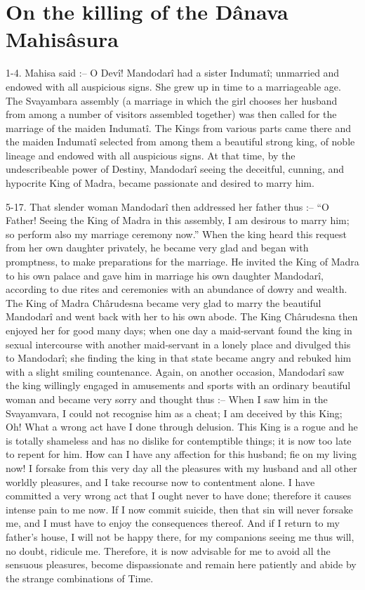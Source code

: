 ﻿\chapter{On the killing of the D\^anava Mahis\^asura}

1-4. Mahisa said :-- O Dev\^i! Mandodar\^i had a sister Indumat\^i; unmarried and endowed with all auspicious signs. She grew up in time to a marriageable age. The Svayambara assembly (a marriage in which the girl chooses her husband from among a number of visitors assembled together) was then called for the marriage of the maiden Indumat\^i. The Kings from various parts came there and the maiden Indumat\^i selected from among them a beautiful strong king, of noble lineage and endowed with all auspicious signs. At that time, by the undescribeable power of Destiny, Mandodar\^i seeing the deceitful, cunning, and hypocrite King of Madra, became passionate and desired to marry him.

5-17. That slender woman Mandodar\^i then addressed her father thus :-- ``O Father! Seeing the King of Madra in this assembly, I am desirous to marry him; so perform also my marriage ceremony now.'' When the king heard this request from her own daughter privately, he became very glad and began with promptness, to make preparations for the marriage. He invited the King of Madra to his own palace and gave him in marriage his own daughter Mandodar\^i, according to due rites and ceremonies with an abundance of dowry and wealth. The King of Madra Ch\^arudesna became very glad to marry the beautiful Mandodar\^i and went back with her to his own abode. The King Ch\^arudesna then enjoyed her for good many days; when one day a maid-servant found the king in sexual intercourse with another maid-servant in a lonely place and divulged this to Mandodar\^i; she finding the king in that state became angry and rebuked him with a slight smiling countenance. Again, on another occasion, Mandodar\^i saw the king willingly engaged in amusements and sports with an ordinary beautiful woman and became very sorry and thought thus :-- When I saw him in the Svayamvara, I could not recognise him as a cheat; I am deceived by this King; Oh! What a wrong act have I done through delusion. This King is a rogue and he is totally shameless and has no dislike for contemptible things; it is now too late to repent for him. How can I have any affection for this husband; fie on my living now! I forsake from this very day all the pleasures with my husband and all other worldly pleasures, and I take recourse now to contentment alone. I have committed a very wrong act that I ought never to have done; therefore it causes intense pain to me now. If I now commit suicide, then that sin will never forsake me, and I must have to enjoy the consequences thereof. And if I return to my father's house, I will not be happy there, for my companions seeing me thus will, no doubt, ridicule me. Therefore, it is now advisable for me to avoid all the sensuous pleasures, become dispassionate and remain here patiently and abide by the strange combinations of Time.

